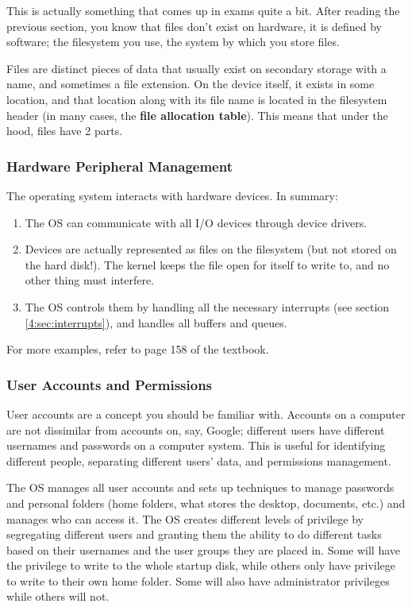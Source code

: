 \documentclass[../main.tex]{subfiles}
\begin{document}
This is actually something that comes up in exams quite a bit. After reading the previous section, you know that files don't exist on hardware, it is defined by software; the filesystem you use, the system by which you store files.

Files are distinct pieces of data that usually exist on secondary storage with a name, and sometimes a file extension. On the device itself, it exists in some location, and that location along with its file name is located in the filesystem header (in many cases, the \textbf{file allocation table}). This means that under the hood, files have 2 parts.

\subsubsection{Hardware Peripheral Management}

The operating system interacts with hardware devices. In summary:

\begin{enumerate}
    \item The OS can communicate with all I/O devices through device drivers.
    \item Devices are actually represented as files on the filesystem (but not stored on the hard disk!). The kernel keeps the file open for itself to write to, and no other thing must interfere.
    \item The OS controls them by handling all the necessary interrupts (see section \ref{4:sec:interrupts}), and handles all buffers and queues.
\end{enumerate}

For more examples, refer to page 158 of the textbook.

\subsubsection{User Accounts and Permissions}

User accounts are a concept you should be familiar with. Accounts on a computer are not dissimilar from accounts on, say, Google; different users have different usernames and passwords on a computer system. This is useful for identifying different people, separating different users' data, and permissions management.

The OS manages all user accounts and sets up techniques to manage passwords and personal folders (home folders, what stores the desktop, documents, etc.) and manages who can access it. The OS creates different levels of privilege by segregating different users and granting them the ability to do different tasks based on their usernames and the user groups they are placed in. Some will have the privilege to write to the whole startup disk, while others only have privilege to write to their own home folder. Some will also have administrator privileges while others will not.
\end{document}
